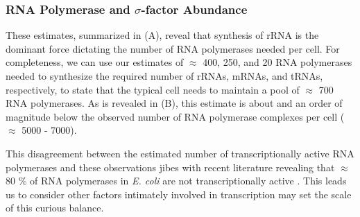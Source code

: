 \begin{figure}
    \begin{fullwidth}
    \end{fullwidth}
\end{figure}



\subsubsection{RNA Polymerase and $\sigma$-factor Abundance} 
These estimates, summarized in  (A), reveal that synthesis
of rRNA is the dominant force dictating the number of RNA polymerases needed
per cell. For completeness, we can use our estimates of $\approx$ 400, 250,
and 20 RNA polymerases needed to synthesize the required number of rRNAs,
mRNAs, and tRNAs, respectively, to state that the typical cell needs to
maintain a pool of $\approx$ 700 RNA polymerases. As is revealed in
 (B), this estimate is about and an order
of magnitude below the observed number of RNA polymerase complexes per cell
($\approx$ 5000 - 7000).

This disagreement between the estimated number of transcriptionally active RNA
polymerases and these observations jibes with recent literature revealing that
$\approx$ 80 \% of RNA polymerases in \textit{E. coli} are not transcriptionally
active \citep{patrick2015}. This leads us to consider other factors intimately
involved in transcription may set the scale of this curious balance. 

